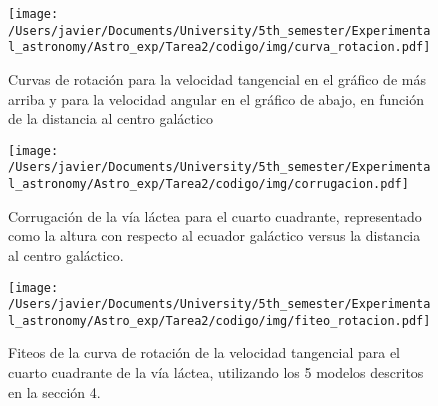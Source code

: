 \documentclass[letterpaper,oneside]{article}
\begin{document}
\begin{figure}[H]
    \centering
    \texttt{[image: /Users/javier/Documents/University/5th\_semester/Experimental\_astronomy/Astro\_exp/Tarea2/codigo/img/curva\_rotacion.pdf]}
    \caption{Curvas de rotación para la velocidad tangencial en el gráfico de más arriba y para la velocidad angular en el gráfico de abajo, en función de la distancia al centro galáctico}
    \label{fig:curva-rotacion}
\end{figure}

\begin{figure}[H]
    \centering
    \texttt{[image: /Users/javier/Documents/University/5th\_semester/Experimental\_astronomy/Astro\_exp/Tarea2/codigo/img/corrugacion.pdf]}
    \caption{Corrugación de la vía láctea para el cuarto cuadrante, representado como la altura con respecto al ecuador galáctico versus la distancia al centro galáctico.}
    \label{fig:corrugacion}
\end{figure}

\begin{figure}[H]
    \centering
    \texttt{[image: /Users/javier/Documents/University/5th\_semester/Experimental\_astronomy/Astro\_exp/Tarea2/codigo/img/fiteo\_rotacion.pdf]}
    \caption{Fiteos de la curva de rotación de la velocidad tangencial para el cuarto cuadrante de la vía láctea, utilizando los 5 modelos descritos en la sección 4.}
    \label{fig:fit-curva-rotacion}
\end{figure}



\end{document}
